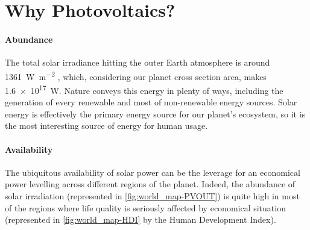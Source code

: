 
\section{Why Photovoltaics?}

	\paragraph{Abundance}
	The total solar irradiance hitting the outer Earth atmosphere is around \SI{1361}{\watt\per\square\metre} \cite{Kopp2011}, which, considering our planet cross section area, makes \SI{1.6e17}{\watt}.
	Nature conveys this energy in plenty of ways, including the generation of every renewable and most of non-renewable energy sources.
	Solar energy is effectively the primary energy source for our planet's ecosystem, so it is the most interesting source of energy for human usage.



	\paragraph{Availability}
	The ubiquitous availability of solar power can be the leverage for an economical power levelling across different regions of the planet.
	Indeed, the abundance of solar irradiation (represented in \cref{fig:world_map-PVOUT}) is quite high in most of the regions where life quality is seriously affected by economical situation (represented in \cref{fig:world_map-HDI} by the Human Development Index).

